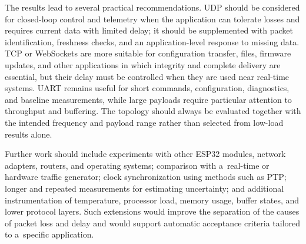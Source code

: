 The results lead to several practical recommendations.
UDP should be considered for closed-loop control and telemetry when the application can tolerate losses and requires current data with limited delay; it should be supplemented with packet identification, freshness checks, and an application-level response to missing data.
TCP or WebSockets are more suitable for configuration transfer, files, firmware updates, and other applications in which integrity and complete delivery are essential, but their delay must be controlled when they are used near real-time systems.
UART remains useful for short commands, configuration, diagnostics, and baseline measurements, while large payloads require particular attention to throughput and buffering.
The topology should always be evaluated together with the intended frequency and payload range rather than selected from low-load results alone.

Further work should include experiments with other ESP32 modules, network adapters, routers, and operating systems; comparison with a~real-time or hardware traffic generator; clock synchronization using methods such as PTP; longer and repeated measurements for estimating uncertainty; and additional instrumentation of temperature, processor load, memory usage, buffer states, and lower protocol layers.
Such extensions would improve the separation of the causes of packet loss and delay and would support automatic acceptance criteria tailored to a~specific application.

